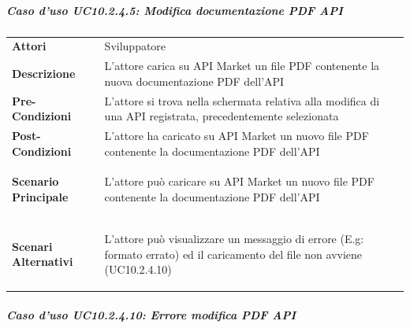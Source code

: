 \subparagraph{Caso d'uso UC10.2.4.5: Modifica documentazione PDF API}
\label{UC10_2_4_5}

\begin{minipage}{\linewidth}
	\begin{tabular}{ l | p{11cm}}
		\hline
		\rowcolor{Gray}
		\multicolumn{2}{c}{UC10.2.4.5 - Modifica documentazione PDF API} \\
		\hline
		\textbf{Attori} & Sviluppatore \\
		\textbf{Descrizione} & L'attore carica su API Market un file PDF contenente la nuova documentazione PDF dell'API \\
		\textbf{Pre-Condizioni} & L'attore si trova nella schermata relativa alla modifica di una API registrata, precedentemente selezionata \\
		\textbf{Post-Condizioni} & L'attore ha caricato su API Market un nuovo file PDF contenente la documentazione PDF dell'API \\
		\textbf{Scenario Principale} & 
		\begin{enumerate*}[label=(\arabic*.),itemjoin={\newline}]
			\item L'attore può caricare su API Market un nuovo file PDF contenente la documentazione PDF dell'API
		\end{enumerate*}\\
		\textbf{Scenari Alternativi} & 
		\begin{enumerate*}[label=(\arabic*.),itemjoin={\newline}]
			\item L'attore può visualizzare un messaggio di errore (E.g: formato errato) ed il caricamento del file non avviene (UC10.2.4.10)
		\end{enumerate*}\\
	\end{tabular}
\end{minipage}

\subparagraph{Caso d'uso UC10.2.4.10: Errore modifica PDF API}
\label{UC10_2_4_10}

